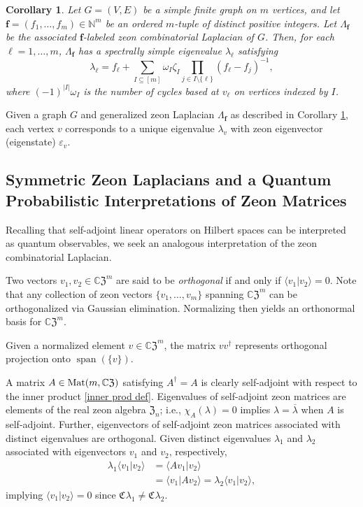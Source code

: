 \documentclass{article}
\newtheorem{corollary}[theorem]{Corollary}
\theoremstyle{definition}
\newcommand{\zco}{\mathfrak{C}\mspace{1mu}}
\newcommand{\CZ}{\mathbb{C}\mathfrak{Z}}
\newcommand{\Mat}{{\rm Mat}}
\newcommand{\Z}{\mathfrak{Z}}
\DeclareMathOperator{\spn}{span}
\numberwithin{equation}{section}
\begin{document}
\begin{corollary}\label{discrete spectrum}
Let $G=(V,E)$ be a simple finite graph on $m$ vertices, and let $\mathbf{f}=(f_1, \ldots, f_m)\in\mathbb{N}^m$ be an ordered $m$-tuple of distinct positive integers.   Let $\Lambda_{\mathbf{f}}$ be the associated ${\mathbf{f}}$-labeled zeon combinatorial Laplacian of $G$.  Then, for each $\ell=1, \ldots, m$, $\Lambda_{\mathbf{f}}$ has a spectrally simple eigenvalue $\lambda_\ell$ satisfying 
\begin{equation*}
\lambda_\ell = f_\ell + \sum_{I\subseteq [m]}\omega_I\zeta_{I}\prod_{j\in I\setminus\{\ell\}}(f_\ell-f_j)^{-1},
\end{equation*}
where $(-1)^{|I|}\omega_I$ is the number of cycles based at $v_\ell$ on vertices indexed by $I$.
\end{corollary}

Given a graph $G$ and generalized zeon Laplacian $\Lambda_{\mathbf{f}}$ as described in Corollary \ref{discrete spectrum}, each vertex $v$ corresponds to a unique eigenvalue $\lambda_v$ with zeon eigenvector (eigenstate) $\varepsilon_v$.  


\subsection{Symmetric Zeon Laplacians and a Quantum Probabilistic Interpretations of Zeon Matrices}

Recalling that self-adjoint linear operators on Hilbert spaces can be interpreted as quantum observables, we seek an analogous interpretation of the zeon combinatorial Laplacian.  

Two vectors $v_1,v_2\in{\CZ}^m$ are said to be {\em orthogonal} if and only if $\langle v_1\vert v_2\rangle=0$.   Note that any collection of zeon vectors $\{v_1, \ldots, v_m\}$ spanning ${\CZ}^m$ can be orthogonalized via Gaussian elimination.  Normalizing then yields an orthonormal basis for ${\CZ}^m$.  

Given a normalized element $v\in{\CZ}^m$, the matrix $vv^\dag$ represents orthogonal projection onto $\spn(\{v\})$.   

A matrix $A\in\Mat(m,\CZ)$ satisfying $A^\dag=A$ is clearly self-adjoint with respect to the inner product \eqref{inner prod def}.  Eigenvalues of self-adjoint zeon matrices are elements of the real zeon algebra $\Z_n$; i.e., $\chi_A(\lambda)=0$ implies $\lambda=\overline{\lambda}$ when $A$ is self-adjoint.   Further, eigenvectors of self-adjoint zeon matrices associated with distinct eigenvalues are orthogonal.  Given distinct eigenvalues $\lambda_1$ and $\lambda_2$ associated with eigenvectors $v_1$ and $v_2$, respectively, 
\begin{align*}
\lambda_1\langle v_1\vert v_2\rangle&=\langle Av_1\vert v_2\rangle\\
&=\langle v_1\vert A v_2\rangle=\lambda_2 \langle v_1\vert v_2\rangle,
\end{align*}
implying $\langle v_1\vert v_2\rangle=0$ since $\zco \lambda_1\ne \zco\lambda_2$.
\end{document}
